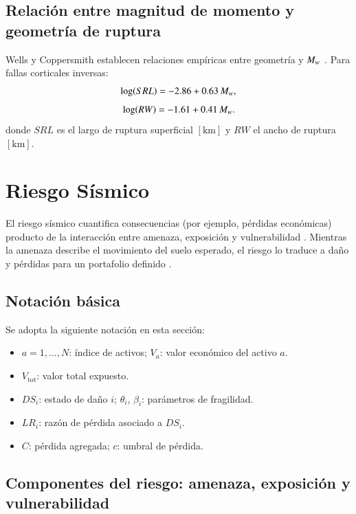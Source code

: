 \subsection{Relación entre magnitud de momento y geometría de ruptura}

Wells y Coppersmith establecen relaciones empíricas entre geometría y \(M_w{}\) \cite{WellsCoppersmith1994}. Para fallas corticales inversas:
\begin{equation}
\log (SRL) = -2.86 + 0.63\,M_w{},
\label{eq:WC1_v2}
\end{equation}
\begin{equation}
\log (RW) = -1.61 + 0.41\,M_w{}.
\label{eq:WC2_v2}
\end{equation}
donde \(SRL\) es el largo de ruptura superficial \([\text{km}]\) y \(RW\) el ancho de ruptura \([\text{km}]\).

\section{Riesgo Sísmico}

El riesgo sísmico cuantifica consecuencias (por ejemplo, pérdidas económicas) producto de la interacción entre amenaza, exposición y vulnerabilidad \cite{KaplanGarrick1981,McGuire2004,BakerBradleyStafford2021}. Mientras la amenaza describe el movimiento del suelo esperado, el riesgo lo traduce a daño y pérdidas para un portafolio definido \cite{McGuire2004}.

\subsection{Notación básica}

Se adopta la siguiente notación en esta sección:
\begin{itemize}
    \item \(a=1,\dots,N\): índice de activos; \(V_a\): valor económico del activo \(a\).
    \item \(V_{\text{tot}}\): valor total expuesto.
    \item \(DS_i\): estado de daño \(i\); \(\theta_i\), \(\beta_i\): parámetros de fragilidad.
    \item \(LR_i\): razón de pérdida asociado a \(DS_i\).
    \item \(C\): pérdida agregada; \(c\): umbral de pérdida.
\end{itemize}

\subsection{Componentes del riesgo: amenaza, exposición y vulnerabilidad}

